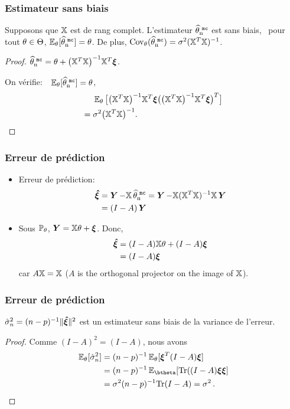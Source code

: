 \begin{frame}
\frametitle{Estimateur sans biais}
\begin{theo}
Supposons que $\mathbb{X}$ est de rang complet.
L'estimateur $\operatorname{\widehat \theta_n^{\,\,{\tt mc}}}$ est sans biais, \ie\ pour tout $\theta \in \Theta$, $\operatorname{{\mathbb E}}_{\theta}[\operatorname{\widehat \theta_n^{\,\,{\tt mc}}}]= \theta$. De plus,
$\mathrm{Cov}_{\theta}(\operatorname{\widehat \theta_n^{\,\,{\tt mc}}})= \sigma^2 (\mathbb{X}^T \mathbb{X})^{-1}$. 
\end{theo}
\pause
\begin{proof}
$\operatorname{\widehat \theta_n^{\,\,{\tt mc}}} = \theta + \big(\mathbb{X}^T\mathbb{X}\big)^{-1}\mathbb{X}^T
\boldsymbol{\xi}$.

On vérifie: $\ \ \E_{\truetheta}[\estMC]=\truetheta$,
\begin{align*}
&\operatorname{{\mathbb E}}_{\theta}\big[ \big(\mathbb{X}^T\mathbb{X}\big)^{-1}\mathbb{X}^T \boldsymbol{\xi} \big(\big(\mathbb{X}^T\mathbb{X}\big)^{-1}\mathbb{X}^T \boldsymbol{\xi}\big)^T\big] \\
=\; &\sigma^2\big(\mathbb{X}^T\mathbb{X}\big)^{-1}.
\end{align*}
\end{proof}
\end{frame}

\begin{frame}
\frametitle{Erreur de prédiction}
\begin{itemize}
\item \alert{Erreur de prédiction}: 
\begin{align*}
\boldsymbol{\hat{\xi}} 
&= \operatorname{\boldsymbol{Y}} - \mathbb{X} \operatorname{\widehat \theta_n^{\,\,{\tt mc}}}= \operatorname{\boldsymbol{Y}} - \mathbb{X} (\mathbb{X}^T \mathbb{X})^{-1} \mathbb{X} \operatorname{\boldsymbol{Y}} \\
&= (I - A) \operatorname{\boldsymbol{Y}}
\end{align*}
\item Sous $\operatorname{{\mathbb P}}_\theta$, $\operatorname{\boldsymbol{Y}}= \mathbb{X} \theta + \boldsymbol{\xi}$. Donc,
\begin{align*}
\boldsymbol{\hat{\xi}} &= (I-A) \mathbb{X} \theta + (I-A) \boldsymbol{\xi} \\
         &= (I-A) \boldsymbol{\xi} 
\end{align*}
car $A \mathbb{X}= \mathbb{X}$ ($A$ is the orthogonal projector on the image of $\mathbb{X}$).
\end{itemize}
\end{frame}

\begin{frame}
\frametitle{Erreur de prédiction}
\begin{theo}
$\hat{\sigma}_n^2= (n-p)^{-1} \| \boldsymbol{\hat{\xi}} \|^2$ est un estimateur sans biais de la variance de l'erreur.
\end{theo}
\begin{proof}
Comme $(I-A)^2= (I-A)$, nous avons
\begin{align*}
\PE_\theta[\hat{\sigma}_n^2] &= (n-p)^{-1} \PE_{\theta}[ \bnoise^T (I-A) \bnoise] \\
                             &= (n-p)^{-1} \PE_{\btheta}[ \mathrm{Tr}( (I-A) \bnoise \bnoise ] \\
                             &= \sigma^2 (n-p)^{-1} \mathrm{Tr}(I-A)= \sigma^2 \eqsp. 
\end{align*}
\end{proof}
\end{frame}


